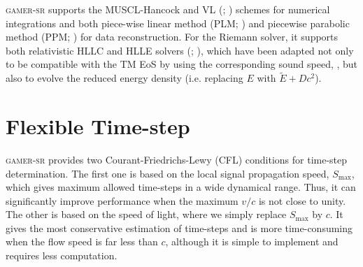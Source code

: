 \textsc{gamer-sr} supports the MUSCL-Hancock \citep{Toro} and VL (\citealt{VL1}; \citealt{VL2}) schemes for numerical integrations and both piece-wise linear method (PLM; \citealt{van_Leer_1979}) and piecewise parabolic method (PPM; \citealt{Woodward1984}) for data reconstruction. For the Riemann solver, it supports both relativistic HLLC and HLLE solvers (\citealt{HLLC_srhydro}; \citealt{HLLC_srmhd}), which have been adapted not only to be compatible with the TM EoS by using the corresponding sound speed, , but also to evolve the reduced energy density (i.e. replacing $E$ with $\tilde{E}+Dc^2$).


\section{Flexible Time-step}
\textsc{gamer-sr} provides two Courant-Friedrichs-Lewy (CFL) conditions for time-step determination. The first one is based on the local signal propagation speed, $S_{\text{max}}$, which gives maximum allowed time-steps in a wide dynamical range. Thus, it can significantly improve performance when the maximum $v/c$ is not close to unity. The other is based on the speed of light, where we simply replace $S_{\text{max}}$ by $c$. It gives the most conservative estimation of time-steps and is more time-consuming when the flow speed is far less than $c$, although it is simple to implement and requires less computation.

